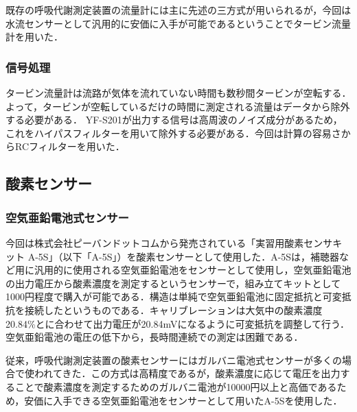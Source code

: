 

既存の呼吸代謝測定装置の流量計には主に先述の三方式が用いられるが，今回は水流センサーとして汎用的に安価に入手が可能であるということでタービン流量計を用いた．

\subsubsection{信号処理}

タービン流量計は流路が気体を流れていない時間も数秒間タービンが空転する．よって，タービンが空転しているだけの時間に測定される流量はデータから除外する必要がある．
YF-S201が出力する信号は高周波のノイズ成分があるため，これをハイパスフィルターを用いて除外する必要がある．今回は計算の容易さからRCフィルターを用いた．

\subsection{酸素センサー}

\subsubsection{空気亜鉛電池式センサー}

今回は株式会社ピーバンドットコムから発売されている「実習用酸素センサキット A-5S」（以下「A-5S」）を酸素センサーとして使用した．A-5Sは，補聴器など用に汎用的に使用される空気亜鉛電池をセンサーとして使用し，空気亜鉛電池の出力電圧から酸素濃度を測定するというセンサーで，組み立てキットとして1000円程度で購入が可能である．構造は単純で空気亜鉛電池に固定抵抗と可変抵抗を接続したというものである．キャリブレーションは大気中の酸素濃度20.84\%とに合わせて出力電圧が20.84mVになるように可変抵抗を調整して行う．空気亜鉛電池の電圧の低下から，長時間連続での測定は困難である．

従来，呼吸代謝測定装置の酸素センサーにはガルバニ電池式センサーが多くの場合で使われてきた．この方式は高精度であるが，酸素濃度に応じて電圧を出力することで酸素濃度を測定するためのガルバニ電池が10000円以上と高価であるため，安価に入手できる空気亜鉛電池をセンサーとして用いたA-5Sを使用した．

